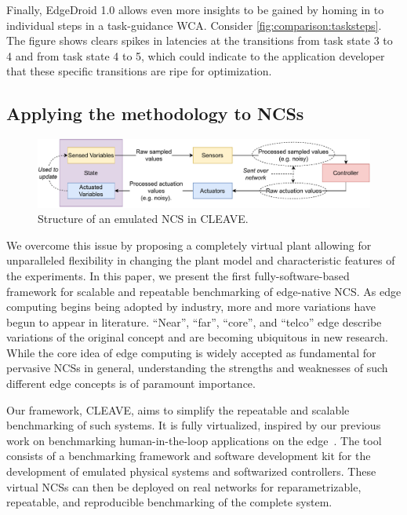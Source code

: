 Finally, EdgeDroid 1.0 allows even more insights to be gained by homing in to individual steps in a task-guidance WCA. Consider \cref{fig:comparison:tasksteps}.
The figure shows clears spikes in latencies at the transitions from task state 3 to 4 and from task state 4 to 5, which could indicate to the application developer that these specific transitions are ripe for optimization.


\label{summary:2019edgedroid}

\subsection{Applying the methodology to \acsp{NCS}}\label{ssec:methodology:ncs}


\begin{figure}
    \centering
    \includegraphics[width=.8\textwidth]{publications/2022CLEAVE/images/CLEAVE_NCS_structure}
    \caption{
        Structure of an emulated \acl*{NCS} in \acs*{CLEAVE}.
    }\label{fig:cleave:ncs:struct}
\end{figure}

We overcome this issue by proposing a completely virtual plant allowing for unparalleled flexibility in changing the plant model and characteristic features of the experiments.
In this paper, we present the first fully-software-based framework for scalable and repeatable benchmarking of edge-native \ac{NCS}.
As edge computing begins being adopted by industry, more and more variations have begun to appear in literature.
``Near'', ``far'', ``core'', and ``telco'' edge describe variations of the original concept and are becoming ubiquitous in new research.
While the core idea of edge computing is widely accepted as fundamental for pervasive \acp{NCS} in general, understanding the strengths and weaknesses of such different edge concepts is of paramount importance.

Our framework, \ac{CLEAVE}, aims to simplify the repeatable and scalable benchmarking of such systems.
It is fully virtualized, inspired by our previous work on benchmarking human-in-the-loop applications on the edge~\cite{Olguin2019EdgeDroid}.
The tool consists of a benchmarking framework and software development kit for the development of emulated physical systems and softwarized controllers.
These virtual \acp{NCS} can then be deployed on real networks for reparametrizable, repeatable, and reproducible benchmarking of the complete system.

